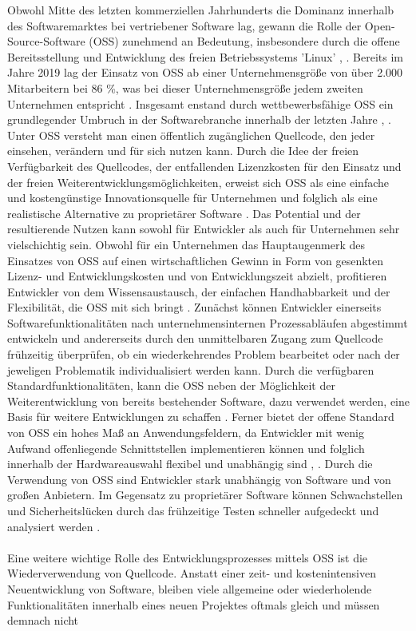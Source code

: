 Obwohl Mitte des letzten kommerziellen Jahrhunderts die Dominanz innerhalb des Softwaremarktes bei vertriebener Software lag, gewann die Rolle der Open-Source-Software (OSS) zunehmend an Bedeutung, insbesondere durch die offene Bereitsstellung und Entwicklung des freien Betriebssystems 'Linux' \cite[S. 8 - 11]{wichmann_linux-_2005}, \cite[S. 1]{will_open-source-software_2003}. Bereits im Jahre 2019 lag der Einsatz von OSS ab einer Unternehmensgröße von über 2.000 Mitarbeitern bei 86 \%, was bei dieser Unternehmensgröße jedem zweiten Unternehmen entspricht \cite[S. 15]{bitkom_open_2020}. Insgesamt enstand durch wettbewerbsfähige OSS ein grundlegender Umbruch in der Softwarebranche innerhalb der letzten Jahre \cite[S. 185]{bitzer_entwicklung_2007}, \cite{fitzgerald_transformation_2006}. Unter OSS versteht man einen öffentlich zugänglichen Quellcode, den jeder einsehen, verändern und für sich nutzen kann. Durch die Idee der freien Verfügbarkeit des Quellcodes, der entfallenden Lizenzkosten für den Einsatz und der freien Weiterentwicklungsmöglichkeiten, erweist sich OSS als eine einfache und kostengünstige Innovationsquelle für Unternehmen und folglich als eine realistische Alternative zu proprietärer Software \cite[S. 21,22]{allmann_open_2019}. Das Potential und der resultierende Nutzen kann sowohl für Entwickler als auch für Unternehmen sehr vielschichtig sein. Obwohl für ein Unternehmen das Hauptaugenmerk des Einsatzes von OSS auf einen wirtschaftlichen Gewinn in Form von gesenkten Lizenz- und Entwicklungskosten und von Entwicklungszeit abzielt, profitieren Entwickler von dem Wissensaustausch, der einfachen Handhabbarkeit und der Flexibilität, die OSS mit sich bringt \cite{lerner_economic_2005}. Zunächst können Entwickler einerseits Softwarefunktionalitäten nach unternehmensinternen Prozessabläufen abgestimmt entwickeln und andererseits durch den unmittelbaren Zugang zum Quellcode frühzeitig überprüfen, ob ein wiederkehrendes Problem bearbeitet oder nach der jeweligen Problematik individualisiert werden kann. Durch die verfügbaren Standardfunktionalitäten, kann die OSS neben der Möglichkeit der Weiterentwicklung von bereits bestehender Software, dazu verwendet werden, eine Basis für weitere Entwicklungen zu schaffen \cite[S. 37/38]{kesler_anpassung_2013}. Ferner bietet der offene Standard von OSS ein hohes Maß an Anwendungsfeldern, da Entwickler mit wenig Aufwand offenliegende Schnittstellen implementieren können und folglich innerhalb der Hardwareauswahl flexibel und unabhängig sind \cite[S. 2]{kesler_anpassung_2013}, \cite[S. 21,22]{allmann_open_2019}. Durch die Verwendung von OSS sind Entwickler stark unabhängig von Software und von großen Anbietern. Im Gegensatz zu proprietärer Software können Schwachstellen und Sicherheitslücken durch das frühzeitige Testen schneller aufgedeckt und analysiert werden \cite[S. 30/31]{kees_open_2015}.\\\\ Eine weitere wichtige Rolle des Entwicklungsprozesses mittels OSS ist die Wiederverwendung von Quellcode. Anstatt einer zeit- und kostenintensiven Neuentwicklung von Software, bleiben viele allgemeine oder wiederholende Funktionalitäten innerhalb eines neuen Projektes oftmals gleich und müssen demnach nicht 